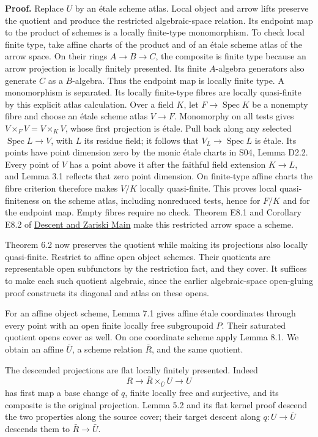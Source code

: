 \documentclass[11pt,a4paper,openany]{report}
\newcounter{none}
\begin{document}
\textbf{Proof.} Replace \(U\) by an étale scheme atlas. Local object and arrow lifts preserve the quotient and produce the restricted algebraic-space relation. Its endpoint map to the product of schemes is a locally finite-type monomorphism. To check local finite type, take affine charts of the product and of an étale scheme atlas of the arrow space. On their rings \(A\to B\to C\), the composite is finite type because an arrow projection is locally finitely presented. Its finite \(A\)-algebra generators also generate \(C\) as a \(B\)-algebra. Thus the endpoint map is locally finite type. A monomorphism is separated. Its locally finite-type fibres are locally quasi-finite by this explicit atlas calculation. Over a field \(K\), let \(F\to\operatorname{Spec}K\) be a nonempty fibre and choose an étale scheme atlas \(V\to F\). Monomorphy on all tests gives \(V\times_FV=V\times_KV\), whose first projection is étale. Pull back along any selected \(\operatorname{Spec}L\to V\), with \(L\) its residue field; it follows that \(V_L\to\operatorname{Spec}L\) is étale. Its points have point dimension zero by the monic étale charts in S04, Lemma D2.2. Every point of \(V\) has a point above it after the faithful field extension \(K\to L\), and Lemma 3.1 reflects that zero point dimension. On finite-type affine charts the fibre criterion therefore makes \(V/K\) locally quasi-finite. This proves local quasi-finiteness on the scheme atlas, including nonreduced tests, hence for \(F/K\) and for the endpoint map. Empty fibres require no check. Theorem E8.1 and Corollary E8.2 of \href{https://github.com/KokunoYumeto/open-math-courses/blob/main/docs/courses/AG-RG/AG-RG-S04.md}{Descent and Zariski Main} make this restricted arrow space a scheme.

Theorem 6.2 now preserves the quotient while making its projections also locally quasi-finite. Restrict to affine open object schemes. Their quotients are representable open subfunctors by the restriction fact, and they cover. It suffices to make each such quotient algebraic, since the earlier algebraic-space open-gluing proof constructs its diagonal and atlas on these opens.

For an affine object scheme, Lemma 7.1 gives affine étale coordinates through every point with an open finite locally free subgroupoid \(P\). Their saturated quotient opens cover as well. On one coordinate scheme apply Lemma 8.1. We obtain an affine \(\bar U\), a scheme relation \(\bar R\), and the same quotient.

The descended projections are flat locally finitely presented. Indeed \[
  R\longrightarrow\bar R\times_{\bar U}U\longrightarrow U
  \] has first map a base change of \(q\), finite locally free and surjective, and its composite is the original projection. Lemma 5.2 and its flat kernel proof descend the two properties along the source cover; their target descent along \(q:U\to\bar U\) descends them to \(\bar R\to\bar U\).
\end{document}
